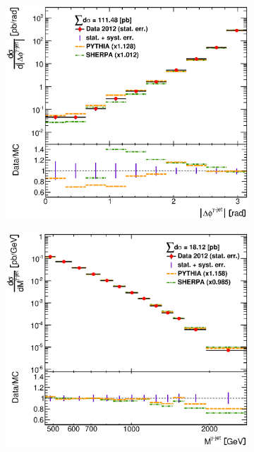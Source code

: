 \documentclass[12pt, twoside]{article}
\numberwithin{equation}{section}
\numberwithin{figure}{section}
\newenvironment{changemargin}[2]{%
\begin{list}{}{%
\setlength{\topsep}{0pt}%
\setlength{\leftmargin}{#1}%
\setlength{\rightmargin}{#2}%
\setlength{\listparindent}{\parindent}%
\setlength{\itemindent}{\parindent}%
\setlength{\parsep}{\parskip}%
}%
\item[]}{\end{list}}
\begin{document}
\begin{figure}
\begin{changemargin}{-1.0cm}{-0.75cm}
\begin{changemargin}{-0.75cm}{-1.0cm}
        \vspace{0.2cm}
        \begin{subfigure}[b]{0.37\textwidth}
            \includegraphics[width=\textwidth]{./images/DifferentialCrossSections/DIFF_CRSS_SEC-107.eps}
            \subcaption{}
            \label{fig:DiffCrossSectDeltaPhiPhotonJet}
        \end{subfigure}
        \begin{subfigure}[b]{0.37\textwidth}
            \includegraphics[width=\textwidth]{./images/DifferentialCrossSections/DIFF_CRSS_SEC-108.eps}

\end{subfigure}
\end{changemargin}
\end{changemargin}
\end{figure}
\end{document}
